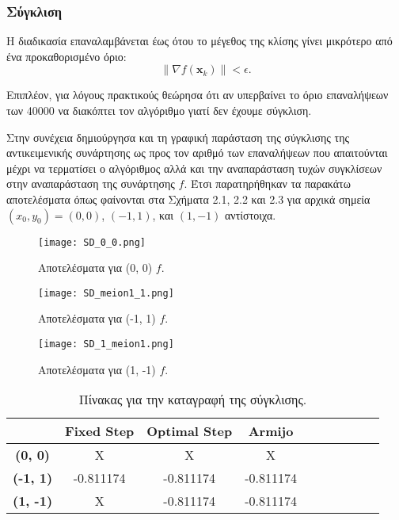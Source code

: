 \documentclass[a4paper,12pt]{report}
\newcommand{\en}{\selectlanguage{english}}
\newcommand{\gr}{\selectlanguage{greek}}
\begin{document}
\subsubsection*{Σύγκλιση}
Η διαδικασία επαναλαμβάνεται έως ότου το μέγεθος της κλίσης γίνει μικρότερο από ένα προκαθορισμένο όριο:
\[
\|\nabla f(\mathbf{x}_k)\| < \epsilon.
\]

\hspace{-0.6cm}Επιπλέον, για λόγους πρακτικούς θεώρησα ότι αν υπερβαίνει το όριο επαναλήψεων των 40000 να διακόπτει τον αλγόριθμο γιατί δεν έχουμε σύγκλιση.

\vspace{0.5cm}

\hspace{-0.6cm}Στην συνέχεια δημιούργησα και τη γραφική παράσταση της σύγκλισης της αντικειμενικής συνάρτησης ως προς τον αριθμό των επαναλήψεων που απαιτούνται μέχρι να τερματίσει ο αλγόριθμος αλλά και την αναπαράσταση τυχών συγκλίσεων στην αναπαράσταση της συνάρτησης \(f\). Έτσι παρατηρήθηκαν τα παρακάτω αποτελέσματα όπως φαίνονται στα Σχήματα 2.1, 2.2 και 2.3 για αρχικά σημεία \((x_0, y_0) = (0,0)\), \((-1,1)\), και \((1,-1)\) αντίστοιχα.

\begin{figure}[ht!]
    \centering
    \texttt{[image: SD\_0\_0.png]} 
    \caption{Aποτελέσματα για (0, 0) \(f\).}
\end{figure}

\begin{figure}[ht!]
    \centering
    \texttt{[image: SD\_meion1\_1.png]} 
    \caption{Αποτελέσματα για (-1, 1) \(f\).}
\end{figure}

\begin{figure}[ht!]
    \centering
    \texttt{[image: SD\_1\_meion1.png]} 
    \caption{Αποτελέσματα για (1, -1) \(f\).}
\end{figure}

\begin{table}[H]
\centering
\renewcommand{\arraystretch}{2} %
\setlength{\tabcolsep}{12pt} %
\begin{tabular}{|c|c|c|c|c|c|c|c|c|c|}
\hline
& \textbf{\en Fixed Step\gr} & \textbf{\en Optimal Step\gr} & \textbf{\en Armijo \gr} \\ \hline
\en
\textbf{(0, 0)} &Χ   &Χ   &Χ  \\ \hline
\textbf{(-1, 1)} &-0.811174   &-0.811174   &-0.811174  \\ \hline
\textbf{(1, -1)} &Χ   &-0.811174   &-0.811174  \\ \hline
\end{tabular}
\caption{Πίνακας για την καταγραφή της σύγκλισης.}
\label{tab:large_convergence}
\end{table}
\end{document}
